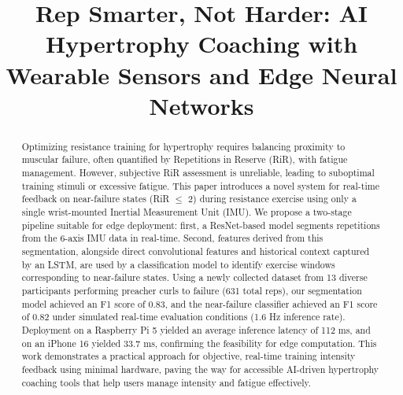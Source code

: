 \documentclass[conference]{IEEEtran}
\begin{document}
\title{Rep Smarter, Not Harder: AI Hypertrophy Coaching with Wearable Sensors and Edge Neural Networks\\}

\author{
\and
{}
\and
{}
}

\maketitle
\thispagestyle{plain}
\pagestyle{plain}

\begin{abstract}
    Optimizing resistance training for hypertrophy requires balancing proximity to muscular failure, often quantified by Repetitions in Reserve (RiR), with fatigue management. However, subjective RiR assessment is unreliable, leading to suboptimal training stimuli or excessive fatigue. This paper introduces a novel system for real-time feedback on near-failure states (RiR $\le$ 2) during resistance exercise using only a single wrist-mounted Inertial Measurement Unit (IMU). We propose a two-stage pipeline suitable for edge deployment: first, a ResNet-based model segments repetitions from the 6-axis IMU data in real-time. Second, features derived from this segmentation, alongside direct convolutional features and historical context captured by an LSTM, are used by a classification model to identify exercise windows corresponding to near-failure states. Using a newly collected dataset from 13 diverse participants performing preacher curls to failure (631 total reps), our segmentation model achieved an F1 score of 0.83, and the near-failure classifier achieved an F1 score of 0.82 under simulated real-time evaluation conditions (1.6 Hz inference rate). Deployment on a Raspberry Pi 5 yielded an average inference latency of 112 ms, and on an iPhone 16 yielded 33.7 ms, confirming the feasibility for edge computation. This work demonstrates a practical approach for objective, real-time training intensity feedback using minimal hardware, paving the way for accessible AI-driven hypertrophy coaching tools that help users manage intensity and fatigue effectively.
\end{abstract}
\end{document}
